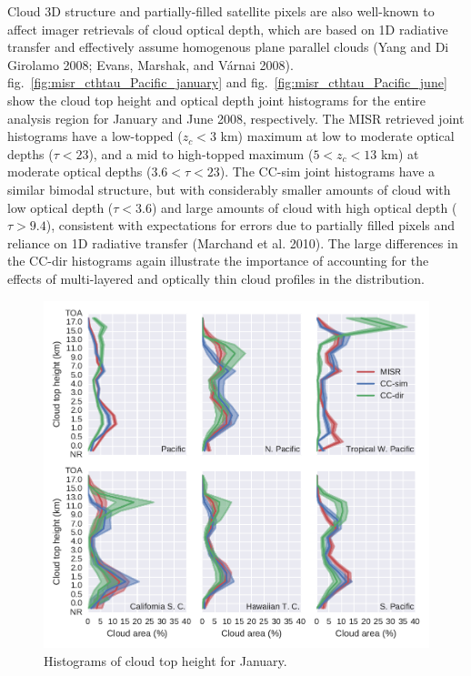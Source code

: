 Cloud 3D structure and partially-filled satellite pixels are also
well-known to affect imager retrievals of cloud optical depth, which are
based on 1D radiative transfer and effectively assume homogenous plane
parallel clouds (Yang and Di Girolamo 2008; Evans, Marshak, and Várnai
2008). fig.~\ref{fig:misr_cthtau_Pacific_january} and
fig.~\ref{fig:misr_cthtau_Pacific_june} show the cloud top height and
optical depth joint histograms for the entire analysis region for
January and June 2008, respectively. The MISR retrieved joint histograms
have a low-topped (\(z_c < 3\) km) maximum at low to moderate optical
depths (\(\tau < 23\)), and a mid to high-topped maximum
(\(5 < z_c < 13\) km) at moderate optical depths (\(3.6 < \tau < 23\)).
The CC-sim joint histograms have a similar bimodal structure, but with
considerably smaller amounts of cloud with low optical depth
(\(\tau < 3.6\)) and large amounts of cloud with high optical depth
(\(\tau > 9.4\)), consistent with expectations for errors due to
partially filled pixels and reliance on 1D radiative transfer (Marchand
et al. 2010). The large differences in the CC-dir histograms again
illustrate the importance of accounting for the effects of multi-layered
and optically thin cloud profiles in the distribution.

\begin{figure}[htbp]
\centering
\includegraphics{graphics/misr_cth_2008-01.pdf}
\caption{\label{fig:misr_cth_region_january}Histograms of cloud top
height for January.}\label{fig:misrux5fcthux5fregionux5fjanuary}
\end{figure}

